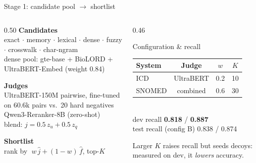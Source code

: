 \documentclass[aspectratio=169,10pt]{beamer}
\newcommand{\hl}[1]{\textcolor{accent}{\textbf{#1}}}
\begin{document}
\begin{frame}{Stage 1: candidate pool $\rightarrow$ shortlist}
\begin{columns}[T]
\begin{column}{0.50\textwidth}
\textbf{Candidates}\\
exact $\cdot$ memory $\cdot$ lexical $\cdot$ dense $\cdot$ fuzzy $\cdot$ crosswalk $\cdot$ char-ngram\\[1pt]
{\small dense pool: gte-base + BioLORD + UltraBERT-Embed (weight 0.84)}

\vspace{3mm}
\textbf{Judges}\\
UltraBERT-150M pairwise, fine-tuned on 60.6k pairs vs.\ 20 hard negatives\\
Qwen3-Reranker-8B (zero-shot)\\
blend: $j=0.5\,z_u+0.5\,z_q$

\vspace{3mm}
\textbf{Shortlist}\\
rank by $\;w\,\hat j+(1-w)\,\hat f$, top-$K$
\end{column}
\begin{column}{0.46\textwidth}
\begin{block}{Configuration \& recall}
\small
\begin{tabular}{@{}lccc@{}}
\toprule
System & Judge & $w$ & $K$\\
\midrule
ICD & UltraBERT & 0.2 & 10\\
SNOMED & combined & 0.6 & 30\\
\bottomrule
\end{tabular}\\[2mm]
dev recall \hl{0.818} / \hl{0.887}\\
test recall (config B) 0.838 / 0.874
\end{block}
\vspace{2mm}
{\small\color{muted}Larger $K$ raises recall but seeds decoys: measured on dev, it \emph{lowers} accuracy.}
\end{column}
\end{columns}
\end{frame}
\end{document}

